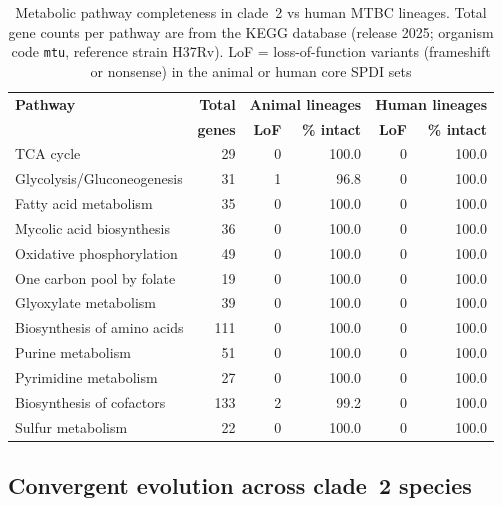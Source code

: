 \documentclass[11pt,a4paper]{article}
\begin{document}
\begin{table}[h]
\centering
\caption{Metabolic pathway completeness in clade~2 vs human MTBC lineages.
Total gene counts per pathway are from the KEGG database (release 2025;
organism code \texttt{mtu}, reference strain H37Rv).
LoF = loss-of-function variants (frameshift or nonsense) in the animal or
human core SPDI sets}
\label{tab:pathway_completeness}
\begin{tabular}{@{}lrrrrr@{}}
\toprule
\textbf{Pathway} & \textbf{Total} & \multicolumn{2}{c}{\textbf{Animal lineages}} & \multicolumn{2}{c}{\textbf{Human lineages}} \\
 & \textbf{genes} & \textbf{LoF} & \textbf{\% intact} & \textbf{LoF} & \textbf{\% intact} \\
\midrule
TCA cycle & 29 & 0 & 100.0 & 0 & 100.0 \\
Glycolysis/Gluconeogenesis & 31 & 1 & 96.8 & 0 & 100.0 \\
Fatty acid metabolism & 35 & 0 & 100.0 & 0 & 100.0 \\
Mycolic acid biosynthesis & 36 & 0 & 100.0 & 0 & 100.0 \\
Oxidative phosphorylation & 49 & 0 & 100.0 & 0 & 100.0 \\
One carbon pool by folate & 19 & 0 & 100.0 & 0 & 100.0 \\
Glyoxylate metabolism & 39 & 0 & 100.0 & 0 & 100.0 \\
Biosynthesis of amino acids & 111 & 0 & 100.0 & 0 & 100.0 \\
Purine metabolism & 51 & 0 & 100.0 & 0 & 100.0 \\
Pyrimidine metabolism & 27 & 0 & 100.0 & 0 & 100.0 \\
Biosynthesis of cofactors & 133 & 2 & 99.2 & 0 & 100.0 \\
Sulfur metabolism & 22 & 0 & 100.0 & 0 & 100.0 \\
\bottomrule
\end{tabular}
\end{table}

\subsection{Convergent evolution across clade~2 species}
\label{sec:results:convergence}
\end{document}

